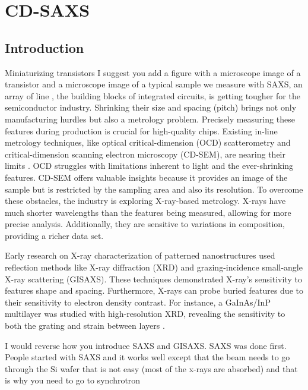 \section{CD-SAXS}
\subsection{Introduction}

\medskip

Miniaturizing transistors \color{red} I suggest you add a figure with a microscope image of a transistor and a microscope image of a typical sample we measure with SAXS, an array of line \color{black}, the building blocks of integrated circuits, is getting
tougher for the semiconductor industry. Shrinking their size and spacing (pitch)
brings not only manufacturing hurdles but also a metrology problem. Precisely
measuring these features during production is crucial for high-quality chips.
Existing in-line metrology techniques, like optical critical-dimension (OCD)
scatterometry and critical-dimension scanning electron microscopy (CD-SEM), are
nearing their limits \cite{SEM_resolution,OCD_resolution}. OCD struggles with limitations inherent to light and the
ever-shrinking features. CD-SEM offers valuable insights because it provides an image of the sample but is restricted by
the sampling area and also its resolution. To overcome these obstacles, the industry is exploring X-ray-based metrology.
X-rays have much shorter wavelengths than the features being measured, allowing
for more precise analysis. Additionally, they are sensitive to variations in
composition, providing a richer data set.

\medskip

Early research on X-ray characterization of patterned nanostructures used reflection
methods like X-ray diffraction (XRD) and grazing-incidence small-angle X-ray scattering (GISAXS). 
These techniques demonstrated X-ray's sensitivity to features shape and spacing.
Furthermore, X-rays can probe buried features due to their sensitivity to electron density contrast. For instance, a GaInAs/InP multilayer was studied with high-resolution XRD, revealing 
the sensitivity to both the grating and strain between layers \cite{Baumbach_Lübbert_Gailhanou_2000}.

\medskip

\color{red} I would reverse how you introduce SAXS and GISAXS. SAXS was done first. People started with SAXS and it works well except that the beam needs to go through the Si wafer that is not easy (most of the x-rays are absorbed) and that is why you need to go to synchrotron \color{black}

